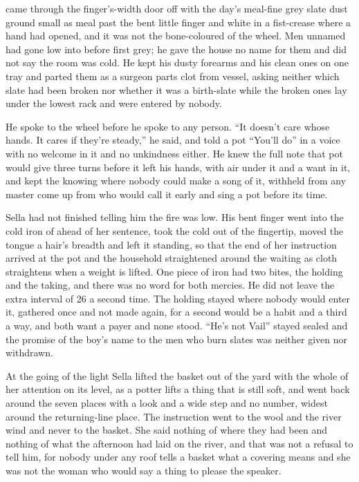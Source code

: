  came through the finger's-width door off  with the day's meal-fine grey slate dust ground small as meal past the bent little finger and white in a fist-crease where a hand had opened, and it was not the bone-coloured  of the wheel. Men unnamed had gone low into  before first grey; he gave the house no name for them and did not say the room was cold. He kept his dusty forearms and his clean ones on one tray and parted them as a surgeon parts clot from vessel, asking neither which slate had been broken nor whether it was a birth-slate while the broken ones lay under the lowest rack and were entered by nobody.

He spoke to the wheel before he spoke to any person. “It doesn't care whose hands. It cares if they're steady,” he said, and told a pot “You'll do” in a voice with no welcome in it and no unkindness either. He knew the full note that pot would give three turns before it left his hands, with air under it and a want in it, and kept the knowing where nobody could make a song of it, withheld from any master come up from  who would call it early and sing a pot before its time.

Sella had not finished telling him the fire was low. His bent finger went into the cold iron of  ahead of her sentence, took the cold out of the fingertip, moved the tongue a hair's breadth and left it standing, so that the end of her instruction arrived at the pot and the household straightened around the waiting as cloth straightens when a weight is lifted. One piece of iron had two bites, the holding and the taking, and there was no  word for both mercies. He did not leave the extra interval of  26 a second time. The holding stayed where nobody would enter it, gathered once and not made again, for a second would be a habit and a third a way, and both want a payer and none stood. “He's not Vail” stayed sealed and the promise of the boy's name to the men who burn slates was neither given nor withdrawn.

\scenebreak

At the going of the light Sella lifted the basket out of the yard with the whole of her attention on its level, as a potter lifts a thing that is still soft, and went back around the seven places with a look and a wide step and no number, widest around the returning-line place. The instruction went to the wool and the river wind and never to the basket. She said nothing of where they had been and nothing of what the afternoon had laid on the river, and that was not a refusal to tell him, for nobody under any roof tells a basket what a covering means and she was not the woman who would say a thing to please the speaker.

